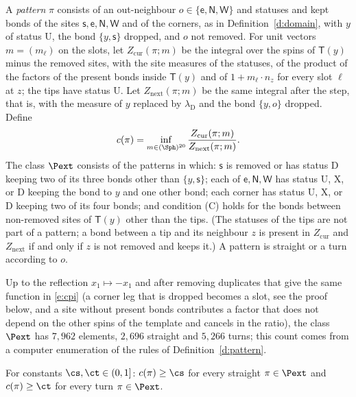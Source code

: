 \begin{definition}\label{d:pattern}
A \emph{pattern} $\pi$ consists of an out-neighbour $o \in \{\mathsf e, \mathsf N, \mathsf W\}$ and statuses and kept bonds of the sites $\mathsf s, \mathsf e, \mathsf N, \mathsf W$ and of the corners, as in Definition~\ref{d:domain}, with $y$ of status $\mathrm U$, the bond $\{y, \mathsf s\}$ dropped, and $o$ not removed. For unit vectors $m = (m_\ell)$ on the slots, let $Z_{\mathrm{cur}}(\pi; m)$ be the integral over the spins of $\mathsf T(y)$ minus the removed sites, with the site measures of the statuses, of the product of the factors of the present bonds inside $\mathsf T(y)$ and of $1 + m_\ell \cdot n_z$ for every slot $\ell$ at $z$; the tips have status $\mathrm U$. Let $Z_{\mathrm{next}}(\pi; m)$ be the same integral after the step, that is, with the measure of $y$ replaced by $\lambda_{\mathrm D}$ and the bond $\{y, o\}$ dropped. Define
\begin{equation}\label{e:cpi}
c(\pi) = \inf_{m \in (\Sph)^{20}} \frac{Z_{\mathrm{cur}}(\pi; m)}{Z_{\mathrm{next}}(\pi; m)} .
\end{equation}
The class $\Pext$ consists of the patterns in which: $\mathsf s$ is removed or has status $\mathrm D$ keeping two of its three bonds other than $\{y, \mathsf s\}$; each of $\mathsf e, \mathsf N, \mathsf W$ has status $\mathrm U$, $\mathrm X$, or $\mathrm D$ keeping the bond to $y$ and one other bond; each corner has status $\mathrm U$, $\mathrm X$, or $\mathrm D$ keeping two of its four bonds; and condition (C) holds for the bonds between non-removed sites of $\mathsf T(y)$ other than the tips. (The statuses of the tips are not part of a pattern; a bond between a tip and its neighbour $z$ is present in $Z_{\mathrm{cur}}$ and $Z_{\mathrm{next}}$ if and only if $z$ is not removed and keeps it.) A pattern is straight or a turn according to $o$.
\end{definition}

Up to the reflection $x_1 \mapsto -x_1$ and after removing duplicates that give the same function in \eqref{e:cpi} (a corner leg that is dropped becomes a slot, see the proof below, and a site without present bonds contributes a factor that does not depend on the other spins of the template and cancels in the ratio), the class $\Pext$ has $7{, }962$ elements, $2{, }696$ straight and $5{, }266$ turns; this count comes from a computer enumeration of the rules of Definition~\ref{d:pattern}.

\begin{hypothesis}[H1]\label{h:H1}
For constants $\cs, \ct \in (0, 1]$: $c(\pi) \ge \cs$ for every straight $\pi \in \Pext$ and $c(\pi) \ge \ct$ for every turn $\pi \in \Pext$.
\end{hypothesis}

